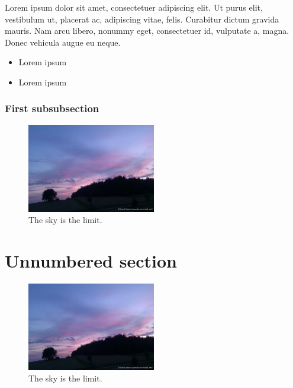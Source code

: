 \documentclass[12pt]{report}
\begin{document}
\leftboxbegin
Lorem ipsum dolor sit amet, consectetuer adipiscing elit. Ut purus elit, vestibulum ut, placerat ac, adipiscing vitae, felis. Curabitur dictum gravida mauris. Nam arcu libero, nonummy eget, consectetuer id, vulputate a, magna. Donec vehicula augue eu neque. 
\leftboxend
\lipsum[1-2]

\rightboxbegin
\begin{itemize}
 \item Lorem ipsum
 \item Lorem ipsum
\end{itemize}
\rightboxend

\lipsum[1]

\subsubsection{First subsubsection}

\lipsum[1]

\begin{figure}[!h]
\centering
\includegraphics[width=0.5\textwidth]{sky.jpg}
\caption{The sky is the limit.}
\end{figure}

\section*{Unnumbered section}
\lipsum[1]

\begin{figure}[!h]
\centering
\includegraphics[width=0.5\textwidth]{sky.jpg}
\caption*{The sky is the limit.}
\end{figure}
\end{document}
